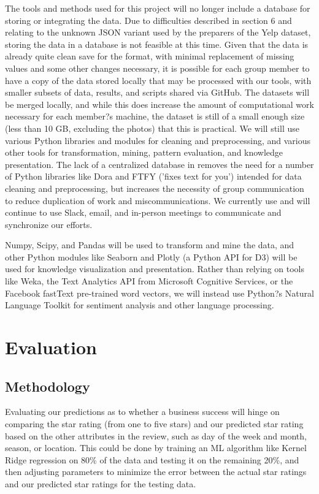 \quad The tools and methods used for this project will no longer include a database for storing or integrating the data. Due to difficulties described in section 6 and relating to the unknown JSON variant used by the preparers of the Yelp dataset, storing the data in a database is not feasible at this time. Given that the data is already quite clean save for the format, with minimal replacement of missing values and some other changes necessary, it is possible for each group member to have a copy of the data stored locally that may be processed with our tools, with smaller subsets of data, results, and scripts shared via GitHub. The datasets will be merged locally, and while this does increase the amount of computational work necessary for each member?s machine, the dataset is still of a small enough size (less than 10 GB, excluding the photos) that this is practical. We will still use various Python libraries and modules for cleaning and preprocessing, and various other tools for transformation, mining, pattern evaluation, and knowledge presentation. The lack of a centralized database in removes the need for a number of Python libraries like Dora and FTFY ('fixes text for you') intended for data cleaning and preprocessing, but increases the necessity of group communication to reduce duplication of work and miscommunications. We currently use and will continue to use Slack, email, and in-person meetings to communicate and synchronize our efforts. 

\quad Numpy, Scipy, and Pandas will be used to transform and mine the data, and other Python modules like Seaborn and Plotly (a Python API for D3) will be used for knowledge visualization and presentation. Rather than relying on tools like Weka, the Text Analytics API from Microsoft Cognitive Services, or the Facebook fastText pre-trained word vectors, we will instead use Python?s Natural Language Toolkit for sentiment analysis and other language processing.


\section{Evaluation}

\subsection{Methodology}

\quad Evaluating our predictions as to whether a business success will hinge on comparing the star rating (from one to five stars) and our predicted star rating based on the other attributes in the review, such as day of the week and month, season, or location. This could be done by training an ML algorithm like Kernel Ridge regression on 80\% of the data and testing it on the remaining 20\%, and then adjusting parameters to minimize the error between the actual star ratings and our predicted star ratings for the testing data.

